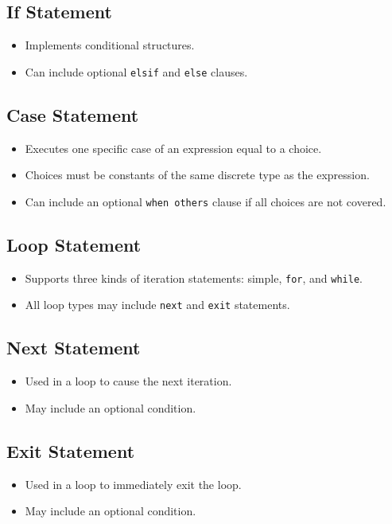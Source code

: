 \documentclass[a4paper,12pt]{article}
\begin{document}
	\subsection*{If Statement}
	\begin{itemize}
		\item Implements conditional structures.
		\item Can include optional \texttt{elsif} and \texttt{else} clauses.
	\end{itemize}
	
	\subsection*{Case Statement}
	\begin{itemize}
		\item Executes one specific case of an expression equal to a choice.
		\item Choices must be constants of the same discrete type as the expression.
		\item Can include an optional \texttt{when others} clause if all choices are not covered.
	\end{itemize}
	
	\subsection*{Loop Statement}
	\begin{itemize}
		\item Supports three kinds of iteration statements: simple, \texttt{for}, and \texttt{while}.
		\item All loop types may include \texttt{next} and \texttt{exit} statements.
	\end{itemize}
	
	\subsection*{Next Statement}
	\begin{itemize}
		\item Used in a loop to cause the next iteration.
		\item May include an optional condition.
	\end{itemize}
	
	\subsection*{Exit Statement}
	\begin{itemize}
		\item Used in a loop to immediately exit the loop.
		\item May include an optional condition.
	\end{itemize}
	
\end{document}
